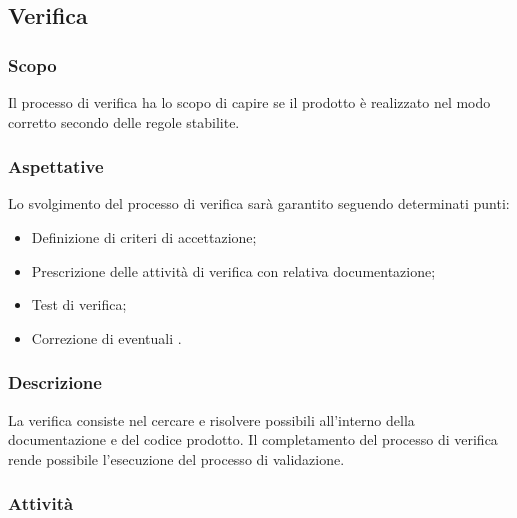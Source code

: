 \subsection{Verifica}

    \subsubsection{Scopo}
    
    Il processo di verifica ha lo scopo di capire se il prodotto è realizzato nel modo corretto secondo delle regole stabilite.
    
    \subsubsection{Aspettative}
    
    Lo svolgimento del processo di verifica sarà garantito seguendo determinati punti:
    
    \begin{itemize}
        \item Definizione di criteri di accettazione;
	\item Prescrizione delle attività di verifica con relativa documentazione;
	\item Test di verifica;
	\item Correzione di eventuali .
    \end{itemize}
    
    \subsubsection{Descrizione}
		La verifica consiste nel cercare e risolvere possibili  all'interno della documentazione e del codice prodotto. Il completamento del processo di verifica rende possibile l'esecuzione del processo di validazione.
    \subsubsection{Attività}
